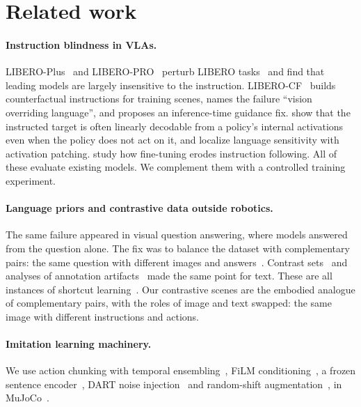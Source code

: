 \documentclass[11pt]{article}
\begin{document}
\section{Related work}

\paragraph{Instruction blindness in VLAs.}
LIBERO-Plus~\citep{fei2025liberoplus} and LIBERO-PRO~\citep{zhou2025liberopro} perturb LIBERO
tasks~\citep{liu2023libero} and find that leading models are largely insensitive to the instruction.
LIBERO-CF~\citep{fang2026vision} builds counterfactual instructions for training scenes, names the
failure ``vision overriding language'', and proposes an inference-time guidance fix.
\citet{jiang2026encoded} show that the instructed target is often linearly decodable from a
policy's internal activations even when the policy does not act on it, and
\citet{wulff2026mechanistic} localize language sensitivity with activation patching.
\citet{zhang2026flatness} study how fine-tuning erodes instruction following. All of these evaluate
existing models. We complement them with a controlled training experiment.

\paragraph{Language priors and contrastive data outside robotics.}
The same failure appeared in visual question answering, where models answered from the question
alone. The fix was to balance the dataset with complementary pairs: the same question with
different images and answers~\citep{goyal2017vqa}. Contrast sets~\citep{gardner2020contrast} and
analyses of annotation artifacts~\citep{gururangan2018annotation} made the same point for text.
These are all instances of shortcut learning~\citep{geirhos2020shortcut}. Our contrastive scenes
are the embodied analogue of complementary pairs, with the roles of image and text swapped: the
same image with different instructions and actions.

\paragraph{Imitation learning machinery.}
We use action chunking with temporal ensembling~\citep{zhao2023act}, FiLM
conditioning~\citep{perez2018film}, a frozen sentence encoder~\citep{reimers2019sbert,wang2020minilm},
DART noise injection~\citep{laskey2017dart} and random-shift augmentation~\citep{kostrikov2021drq}, in
MuJoCo~\citep{todorov2012mujoco}.
\end{document}
